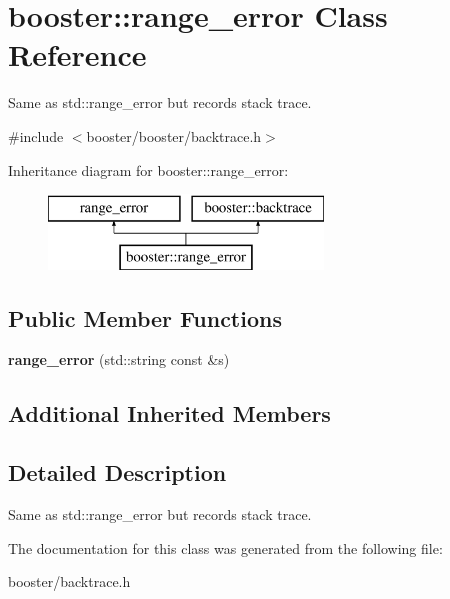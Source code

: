 \section{booster\-:\-:range\-\_\-error Class Reference}
\label{classbooster_1_1range__error}


Same as std\-::range\-\_\-error but records stack trace.  




{\ttfamily \#include $<$booster/booster/backtrace.\-h$>$}

Inheritance diagram for booster\-:\-:range\-\_\-error\-:\begin{figure}[H]
\begin{center}
\leavevmode
\includegraphics[height=2.000000cm]{classbooster_1_1range__error}
\end{center}
\end{figure}
\subsection*{Public Member Functions}
\begin{DoxyCompactItemize}
\item 
{\bfseries range\-\_\-error} (std\-::string const \&s)\label{classbooster_1_1range__error_afaeb47be39652f3ca5d0143b8d4721f1}

\end{DoxyCompactItemize}
\subsection*{Additional Inherited Members}


\subsection{Detailed Description}
Same as std\-::range\-\_\-error but records stack trace. 

The documentation for this class was generated from the following file\-:\begin{DoxyCompactItemize}
\item 
booster/backtrace.\-h\end{DoxyCompactItemize}
